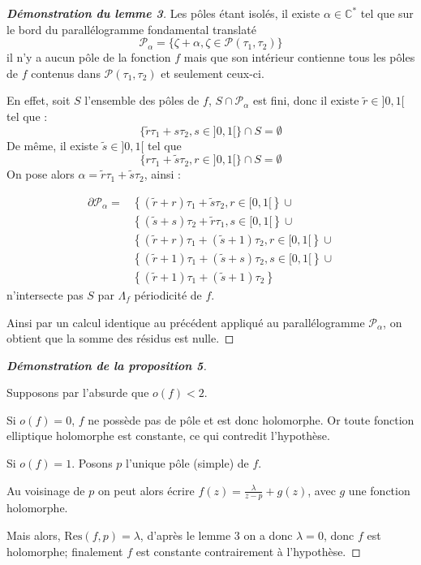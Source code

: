 \documentclass[12pt]{article}
\begin{document}
\begin{proof}[\textbf{Démonstration du lemme 3}]
    Les pôles étant isolés, il existe \( \alpha \in \mathbb{C}^* \) tel que sur le bord du parallélogramme fondamental translaté
    \[
    \mathcal{P}_\alpha = \{ \zeta + \alpha, \zeta \in \mathcal{P}(\tau_1, \tau_2)\}
    \]
    il n’y a aucun pôle de la fonction \( f \) mais que son intérieur contienne tous les pôles de \( f \) contenus dans \( \mathcal{P}(\tau_1, \tau_2) \) et seulement ceux-ci.

    En effet, soit \( S \) l'ensemble des pôles de \( f \), \( S \cap \mathcal{P}_\alpha \) est fini, donc il existe \(  \tilde{r} \in ]0, 1[ \) tel que :
    \[
    \{\tilde{r}\tau_1 + s\tau_2, s \in ]0, 1[\} \cap S = \emptyset
    \]
    De même, il existe \( \tilde{s} \in ]0, 1[ \) tel que
    \[
    \{r\tau_1 + \tilde{s}\tau_2, r \in ]0, 1[\} \cap S = \emptyset
    \]
    On pose alors \( \alpha = \tilde{r}\tau_1 + \tilde{s}\tau_2 \), ainsi :

    \begin{align*}
        \partial \mathcal{P}_\alpha = & \left\{ (\tilde{r}+r)\tau_1 + \tilde{s}\tau_2, r \in [0, 1[ \right\} \cup \\
                            & \left\{ (\tilde{s}+ s)\tau_2 + \tilde{r}\tau_1, s \in [0, 1[ \right\} \cup \\
                            & \left\{ (\tilde{r} + r)\tau_1 + (\tilde{s} + 1)\tau_2, r \in [0, 1[ \right\} \cup \\
                            & \left\{ (\tilde{r} + 1)\tau_1 + (\tilde{s} + s)\tau_2, s \in [0, 1[ \right\} \cup \\
                            & \left\{ (\tilde{r} + 1)\tau_1 + (\tilde{s} + 1)\tau_2 \right\}
    \end{align*}
    n'intersecte pas \( S \) par \( \Lambda_f \) périodicité de \( f \).

    Ainsi par un calcul identique au précédent appliqué au parallélogramme \( \mathcal{P}_\alpha \), on obtient que la somme des résidus est nulle.
    \end{proof}

    \begin{proof}[\textbf{Démonstration de la proposition 5}] \



Supposons par l'absurde que \( o(f) < 2 \).

Si \( o(f) = 0 \), \( f \) ne possède pas de pôle et est donc holomorphe. Or toute fonction elliptique holomorphe est constante, ce qui contredit l'hypothèse.

Si \( o(f) = 1 \). Posons \( p \) l'unique pôle (simple) de \( f \).

Au voisinage de \( p \) on peut alors écrire \( f(z) = \frac{\lambda}{z - p} + g(z) \), avec \( g \) une fonction holomorphe.

Mais alors, \( \text{Res}(f, p) = \lambda \), d'après le lemme 3 on a donc \( \lambda = 0 \), donc \( f \) est holomorphe; finalement \( f \) est constante contrairement à l'hypothèse.
\end{proof}
\end{document}
